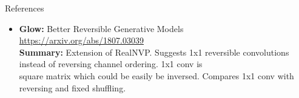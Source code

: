 \documentclass{beamer}
\begin{document}
\begin{frame}{References}
{\begin{itemize}
			\item \textbf{Glow:} Better Reversible Generative Models \\
			\href{https://arxiv.org/abs/1807.03039}{https://arxiv.org/abs/1807.03039} \\
			\textbf{Summary:} Extension of RealNVP. Suggests 1x1 reversible convolutions instead of reversing channel ordering. 1x1 conv is \\ square matrix which could be easily be inversed. Compares 1x1 conv with reversing and fixed shuffling. 
		\end{itemize}
	}
\end{frame}
\end{document}
